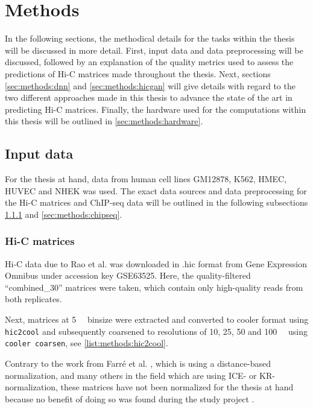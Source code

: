 \section{Methods}
In the following sections, the methodical details for the tasks within the thesis will be discussed in more detail.
First, input data and data preprocessing will be discussed, followed by an explanation of the quality metrics used to assess the predictions
of Hi-C matrices made throughout the thesis.
Next, sections \ref{sec:methods:dnn} and \ref{sec:methods:hicgan} will give details with regard to the two 
different approaches made in this thesis to advance the state of the art in predicting Hi-C matrices.
Finally, the hardware used for the computations within this thesis will be outlined in \cref{sec:methods:hardware}.

\subsection{Input data} \label{sec:methods:input_data}
For the thesis at hand, data from human cell lines GM12878, K562, HMEC, HUVEC and NHEK was used.
The exact data sources and data preprocessing for the Hi-C matrices and ChIP-seq data 
will be outlined in the following subsections \ref{sec:methods:hicMatrices} and \ref{sec:methods:chipseq}.

\subsubsection{Hi-C matrices} \label{sec:methods:hicMatrices}
Hi-C data due to Rao et al. \cite{Rao2014} was downloaded 
in .hic format from Gene Expression Omnibus under accession key GSE63525.
Here, the quality-filtered ``combined\_30'' matrices were taken, which contain only high-quality reads from 
both replicates.

Next, matrices at \SI{5}{\kilo\bp} binsize were extracted and converted to cooler format using \texttt{hic2cool}
and subsequently coarsened to resolutions of 10, 25, 50 and \SI{100}{\kilo\bp} using \texttt{cooler coarsen},
see \cref{list:methods:hic2cool}.

Contrary to the work from Farr\'e et al. \cite{Farre2018a}, which is using a distance-based normalization,
and many others in the field which are using ICE- or KR-normalization, 
these matrices have not been normalized for the thesis at hand
because no benefit of doing so was found during the study project \cite{Krauth2020}.

